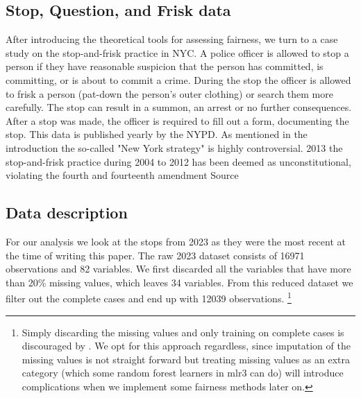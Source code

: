 \subsection*{Stop, Question, and Frisk data}
After introducing the theoretical tools for assessing fairness, we turn to a case study on the stop-and-frisk practice in NYC. A police officer is allowed to stop a person if they have reasonable suspicion that the person has committed, is committing, or is about to commit a crime.
During the stop the officer is allowed to frisk a person (pat-down the person's outer clothing) or search them more carefully.
The stop can result in a summon, an arrest or no further consequences. After a stop was made, the officer is required to fill out a form, documenting the stop. This data is published yearly by the NYPD.
As mentioned in the introduction the so-called "New York strategy" \cite{gelman2007} is highly controversial. 2013 the stop-and-frisk practice during 2004 to 2012 has been deemed as unconstitutional, violating the fourth and fourteenth amendment {\color{red} Source}

\subsection{Data description}
For our analysis we look at the stops from 2023 as they were the most recent at the time of writing this paper. The raw 2023 dataset consists of 16971 observations and 82 variables. We first discarded all the variables that have more than 20\% missing values, which leaves 34 variables.
From this reduced dataset we filter out the complete cases and end up with 12039 observations. \footnote{Simply discarding the missing values and only training on complete cases is discouraged by \cite{fernando2021}. We opt for this approach regardless, since imputation of the missing values is not straight forward
but treating missing values as an extra category (which some random forest learners in mlr3 can do) will introduce complications when we implement some fairness methods later on.}

